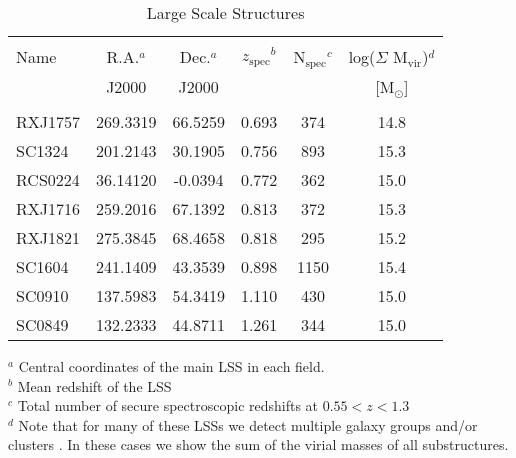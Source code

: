 \documentclass[a4paper,fleqn,usenatbib]{mnras}
\def\zspec{$z_{\mathrm{spec}}$}
\begin{document}
\begin{table}
	\begin{center}
	\caption{Large Scale Structures}
	\label{tab:lss}

	\begin{tabular}{lccccc}

	\hline \\[-5mm]  
	\hline \\[-3mm]  

	Name & R.A.$^a$ & Dec.$^a$ & \zspec$^b$ & N$_{\mathrm{spec}}$$^c$ & log($\Sigma$ M$_{\mathrm{vir}}$)$^d$ \\
	 & J2000 & J2000 & & & [M$_{\odot}$] \\[-0.5mm]

	\hline \\[-2mm]


	RXJ1757  &   269.3319   &   66.5259   &   0.693   &  374   &   14.8  \\
	SC1324   &   201.2143   &   30.1905   &   0.756   &  893   &   15.3  \\
	RCS0224  &   36.14120   &   -0.0394   &   0.772   &  362   &   15.0  \\
	RXJ1716  &   259.2016   &   67.1392   &   0.813   &  372   &   15.3  \\
	RXJ1821  &   275.3845   &   68.4658   &   0.818   &  295   &   15.2  \\
	SC1604   &   241.1409   &   43.3539   &   0.898   &  1150  &   15.4  \\
	SC0910   &   137.5983   &   54.3419   &   1.110   &  430   &   15.0  \\
	SC0849   &   132.2333   &   44.8711   &   1.261   &  344   &   15.0  \\[0.5mm]
	\hline

	\end{tabular}
	\end{center}

	$^a$ Central coordinates of the main LSS in each field. \\
	$^b$ Mean redshift of the LSS \\
	$^c$ Total number of secure spectroscopic redshifts at $0.55 < z < 1.3$ \\
	$^d$ Note that for many of these LSSs we detect multiple galaxy groups and/or clusters \citep[see][]{Rumbaugh2017}.
	In these cases we show the sum of the virial masses of all substructures.
\end{table}




\end{document}
